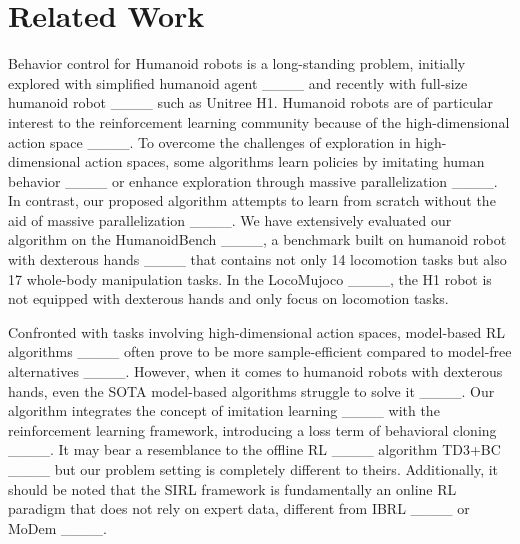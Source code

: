 \section{Related Work}
Behavior control for Humanoid robots is a long-standing problem, initially explored with simplified humanoid agent ____ and recently with full-size humanoid robot ____ such as Unitree H1.
Humanoid robots are of particular interest to the reinforcement learning community because of the high-dimensional action space ____.
To overcome the challenges of exploration in high-dimensional action spaces, some algorithms learn policies by imitating human behavior ____ or enhance exploration through massive parallelization ____.
In contrast, our proposed algorithm attempts to learn from scratch without the aid of massive parallelization ____. 
We have extensively evaluated our algorithm on the HumanoidBench ____, a benchmark built on humanoid robot with dexterous hands ____ that contains not only  14 locomotion tasks but also  17 whole-body manipulation tasks.
In the LocoMujoco ____, the H1 robot is not equipped with dexterous hands and only focus on locomotion tasks.

Confronted with tasks involving high-dimensional action spaces, model-based RL algorithms ____ often prove to be more sample-efficient compared to model-free alternatives ____. 
However, when it comes to humanoid robots with dexterous hands, even the SOTA model-based algorithms struggle to solve it ____. 
Our algorithm integrates the concept of imitation learning ____ with the reinforcement learning framework, introducing a loss term of behavioral cloning ____.  It may bear a  resemblance to the offline RL ____ algorithm TD3+BC ____ but our problem setting is   completely different to theirs.
Additionally, it should be noted that the SIRL framework is fundamentally an online RL paradigm that does not rely on expert data, different from IBRL ____ or MoDem ____.